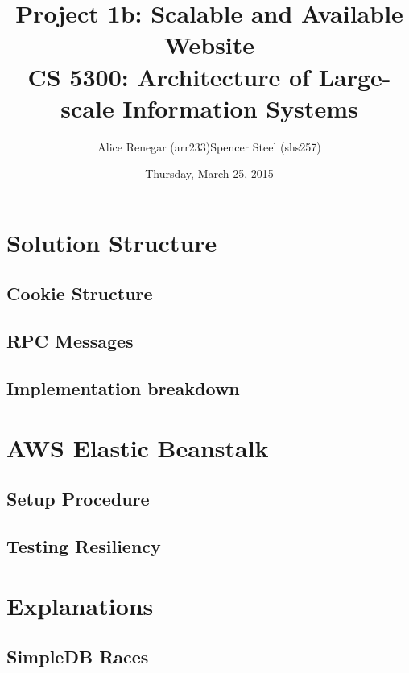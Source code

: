 \documentclass[11pt]{article}
\begin{document}
\title{\vspace*{-0ex}Project 1b: Scalable and Available Website\\
   \smaller CS 5300: Architecture of Large-scale Information Systems\vspace*{-1ex}}
\author{\begin{tabular}{rl}
   Alice Renegar (arr233) & Spencer Steel (shs257)\\
   \end{tabular}}
\date{Thursday, March 25, 2015}
\maketitle

\section{Solution Structure}

\subsection{Cookie Structure}

\subsection{RPC Messages}

\subsection{Implementation breakdown}

\section{AWS Elastic Beanstalk}

\subsection{Setup Procedure}

\subsection{Testing Resiliency}

\section{Explanations}

\subsection{SimpleDB Races}
\end{document}
